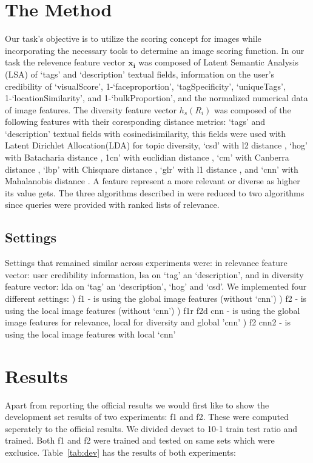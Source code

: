 \documentclass{sig-alternate}
\begin{document}
{\section{The Method}
Our task's objective is to utilize the scoring concept for images while incorporating the necessary tools to determine an image scoring function. In our task 
the relevence feature vector $\mathbf{x_{i}}$ was composed of Latent Semantic Analysis (LSA) \cite{lsa} of `tags' and `description' textual fields, 
information on the user's credibility of `visualScore', 1-`faceproportion', `tagSpecificity', `uniqueTags', 1-`locationSimilarity', and 1-`bulkProportion', 
and the normalized numerical data of image features.
The diversity feature vector $h_{s}(R_{i})$ was composed of the following features with their coresponding distance metrics: 
`tags' and `description' textual fields with cosinedisimilarity, this fields were used with Latent Dirichlet Allocation(LDA) \cite{lda} for topic diversity, `csd' with l2 distance \cite{csd}, `hog' with Batacharia distance \cite{hog}, 1cn' with
euclidian distance \cite{cn}, `cm' with Canberra distance \cite{cm}, `lbp' with Chisquare distance \cite{glbp}, `glr' with l1 distance \cite{glr}, 
and `cnn' with Mahalanobis distance \cite{cnn}. A feature represent a more relevant or diverse as higher its value gets.
The three algorithms described in \cite{fscore} were reduced to two algorithms since queries were provided with ranked lists 
of relevance.


\subsection{Settings}
Settings that remained similar across experiments were:
in relevance feature vector: user credibility information, lsa on `tag' an `description', and in diversity feature vector:
lda on `tag' an `description', `hog' and `csd'.
We implemented four different settings:
) f1 - is using the global image features (without `cnn')
) f2 - is using the local image features (without `cnn')
) f1r f2d cnn - is using the global image features for relevance, local for diversity and global 'cnn'
) f2 cnn2 - is using the local image features with local `cnn'


\section{Results}
Apart from reporting the official results we would first like to show the development set results of 
two experiments: f1 and f2. These were computed seperately to the official results. We divided devset to 10-1 train test ratio
and trained. Both f1 and f2 were trained and tested on same sets which were exclusice. 
Table~\ref{tab:dev} has the results of both experiments:

}
\end{document}
